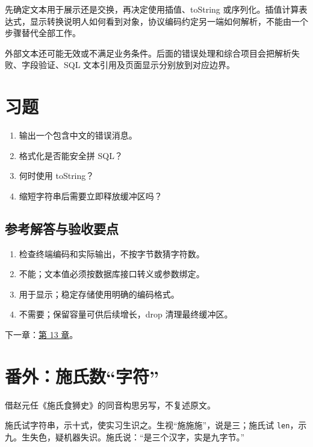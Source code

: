 先确定文本用于展示还是交换，再决定使用插值、toString 或序列化。插值计算表达式，显示转换说明人如何看到对象，协议编码约定另一端如何解析，不能由一个步骤替代全部工作。

外部文本还可能无效或不满足业务条件。后面的错误处理和综合项目会把解析失败、字段验证、SQL 文本引用及页面显示分别放到对应边界。

\section{习题}

\begin{enumerate}

\item 输出一个包含中文的错误消息。

\item 格式化是否能安全拼 SQL？

\item 何时使用 toString？

\item 缩短字符串后需要立即释放缓冲区吗？

\end{enumerate}

\subsection*{参考解答与验收要点}

\begin{enumerate}

\item 检查终端编码和实际输出，不按字节数猜字符数。

\item 不能；文本值必须按数据库接口转义或参数绑定。

\item 用于显示；稳定存储使用明确的编码格式。

\item 不需要；保留容量可供后续增长，drop 清理最终缓冲区。

\end{enumerate}

下一章：\hyperref[ch:13]{第 13 章}。

\section{番外：施氏数“字符”}

借赵元任《施氏食狮史》的同音构思另写，不复述原文。

施氏试字符串，示十式，使实习生识之。生视“施施施”，说是三；施氏试 \texttt{len}，示九。生失色，疑机器失识。施氏说：“是三个汉字，实是九字节。”

